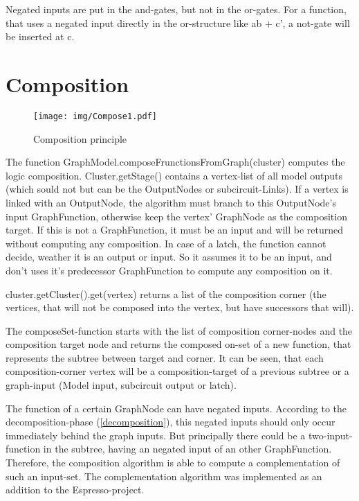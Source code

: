 \documentclass[colorback,accentcolor=tud1c,11pt]{tudreport}
\begin{document}
Negated inputs are put in the and-gates, but not in the or-gates. For a function, that uses a negated input directly in the or-structure like ab + c', a not-gate will be inserted at c.







\chapter{Composition}
\label{composition}
\begin{wrapfigure}{r}{0.41\textwidth}
\centering
\texttt{[image: img/Compose1.pdf]}\\
\caption{Composition principle}
\label{fig:decompose1}
\end{wrapfigure}
The function GraphModel.composeFrunctionsFromGraph(cluster) computes the logic composition. Cluster.getStage() contains a vertex-list of all model outputs (which sould not but can be the OutputNodes or subcircuit-Links). If a vertex is linked with an OutputNode, the algorithm must branch to this OutputNode's input GraphFunction, otherwise keep the vertex' GraphNode as the composition target. If this is not a GraphFunction, it must be an input and will be returned without computing any composition. In case of a latch, the function cannot decide, weather it is an output or input. So it assumes it to be an input, and don't uses it's predecessor GraphFunction to compute any composition on it.

cluster.getCluster().get(vertex) returns a list of the composition corner (the vertices, that will not be composed into the vertex, but have successors that will).

The composeSet-function starts with the list of composition corner-nodes and the composition target node and returns the composed on-set of a new function, that represents the subtree between target and corner. It can be seen, that each composition-corner vertex will be a composition-target of a previous subtree or a graph-input (Model input, subcircuit output or latch).

The function of a certain GraphNode can have negated inputs. According to the decomposition-phase (\ref{decomposition}), this negated inputs should only occur immediately behind the graph inputs. But principally there could be a two-input-function in the subtree, having an negated input of an other GraphFunction. Therefore, the composition algorithm is able to compute a complementation of such an input-set. The complementation algorithm was implemented as an addition to the Espresso-project.
\end{document}
